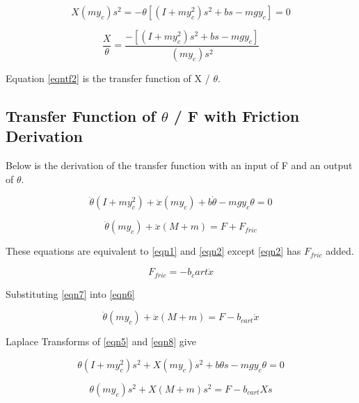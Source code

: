 \documentclass{article}
\begin{document}
\begin{equation} 
\label{eqn4}
X (m y_c) s^2 = -\theta [(I+m y_c^2) s^2+b s - m g y_c] = 0 
\end{equation}

\begin{equation} 
\label{eqntf2}
\frac{X}{\theta} = \frac{-[(I+m y_c^2) s^2+b s - m g y_c]}{(m y_c) s^2} 
\end{equation}

Equation \ref{eqntf2} is the transfer function of X / $\theta$.



\subsection{Transfer Function of $\theta$ / F with Friction Derivation}

Below is the derivation of the transfer function with an input of F and an output of $\theta$.

\begin{equation} 
\label{eqn5}
\ddot \theta (I+m y_c^2)+\ddot x (m y_c)+b \dot \theta - m g y_c \theta = 0 
\end{equation}

\begin{equation} 
\label{eqn6}
\ddot \theta(m y_c) + \ddot x(M+m) = F+ F_{fric}
\end{equation}

These equations are equivalent to \ref{eqn1} and \ref{eqn2} except \ref{eqn2} has $F_{fric}$ added.

\begin{equation}
\label{eqn7}
F_{fric} = - b_cart \dot x
\end{equation}

Substituting \ref{eqn7} into \ref{eqn6}

\begin{equation} 
\label{eqn8}
\ddot \theta(m y_c) + \ddot x(M+m) = F - b_{cart} \dot x
\end{equation}

Laplace Transforms of \ref{eqn5} and \ref{eqn8} give

\begin{equation} 
\label{eqn5l}
\theta (I+m y_c^2) s^2+ X (m y_c) s^2+b \theta s - m g y_c \theta = 0 
\end{equation}

\begin{equation} 
\label{eqn8l}
\theta (m y_c) s^2+ X (M+m) s^2= F - b_{cart} X s
\end{equation}
\end{document}
